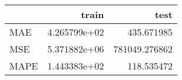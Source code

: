 \begin{tabular}{lrr}
\toprule
{} &         train &           test \\
\midrule
MAE  &  4.265799e+02 &     435.671985 \\
MSE  &  5.371882e+06 &  781049.276862 \\
MAPE &  1.443383e+02 &     118.535472 \\
\bottomrule
\end{tabular}
